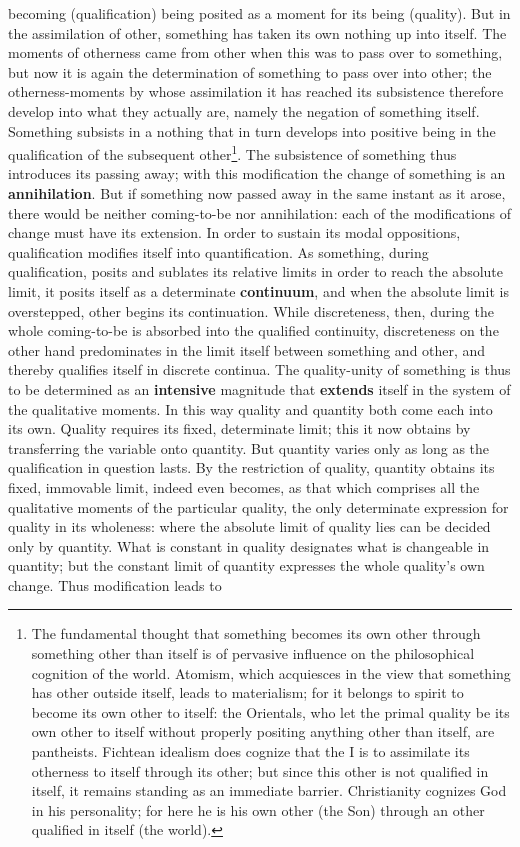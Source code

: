 \documentclass[12pt,a4paper,openany]{book}
\newcommand{\opage}[1]{\marginnote{\footnotesize\textit{[#1]}}}
\begin{document}
\opage{57}becoming (qualification) being posited as a moment for its being (quality). But in the assimilation of other, something has taken its own nothing up into itself. The moments of otherness came from other when this was to pass over to something, but now it is again the determination of something to pass over into other; the otherness-moments by whose assimilation it has reached its subsistence therefore develop into what they actually are, namely the negation of something itself. Something subsists in a nothing that in turn develops into positive being in the qualification of the subsequent other\footnote{The fundamental thought that something becomes its own other through something other than itself is of pervasive influence on the philosophical cognition of the world. Atomism, which acquiesces in the view that something has other outside itself, leads to materialism; for it belongs to spirit to become its own other to itself: the Orientals, who let the primal quality be its own other to itself without properly positing anything other than itself, are pantheists. Fichtean idealism does cognize that the I is to assimilate its otherness to itself through its other; but since this other is not qualified in itself, it remains standing as an immediate barrier. Christianity cognizes God in his personality; for here he is his own other (the Son) through an other qualified in itself (the world).}. The subsistence of something thus introduces its passing away; with this modification the change of something is an \textbf{annihilation}. But if something now passed away in the same instant as it arose, there would be neither coming-to-be nor annihilation: each of the modifications of change must have its extension. In order to sustain its modal oppositions, qualification modifies itself into quantification.
\setcounter{footnote}{0}%
\opage{58}As something, during qualification, posits and sublates its relative limits in order to reach the absolute limit, it posits itself as a determinate \textbf{continuum}, and when the absolute limit is overstepped, other begins its continuation. While discreteness, then, during the whole coming-to-be is absorbed into the qualified continuity, discreteness on the other hand predominates in the limit itself between something and other, and thereby qualifies itself in discrete continua. The quality-unity of something is thus to be determined as an \textbf{intensive} magnitude that \textbf{extends} itself in the system of the qualitative moments. In this way quality and quantity both come each into its own. Quality requires its fixed, determinate limit; this it now obtains by transferring the variable onto quantity. But quantity varies only as long as the qualification in question lasts. By the restriction of quality, quantity obtains its fixed, immovable limit, indeed even becomes, as that which comprises all the qualitative moments of the particular quality, the only determinate expression for quality in its wholeness: where the absolute limit of quality lies can be decided only by quantity. What is constant in quality designates what is changeable in quantity; but the constant limit of quantity expresses the whole quality's own change. Thus modification leads to
\end{document}
